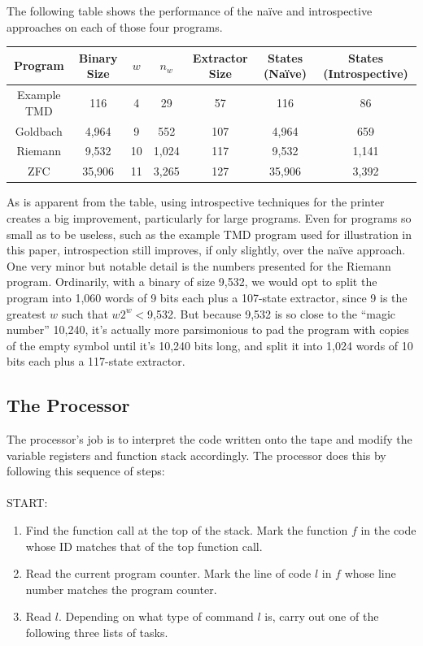 \documentclass[11pt]{article}
\begin{document}
The following table shows the performance of the na\"ive and introspective approaches on each of those four programs.

\begin{center}
    \begin{tabular}{||c c c c c c c||}
    \hline
    Program & Binary Size & $w$ & $n_w$ & Extractor Size & States (Na\"ive) & States (Introspective) \\ [0.5ex]
    \hline\hline
    Example TMD & 116 & 4 & 29 & 57 & 116 & 86 \\
    \hline
    Goldbach & 4,964 & 9 & 552 & 107 & 4,964 & 659 \\
    \hline
    Riemann & 9,532 & 10 & 1,024 & 117 & 9,532 & 1,141 \\
    \hline 
    ZFC & 35,906 & 11 & 3,265 & 127 & 35,906 & 3,392 \\
    \hline
    \end{tabular}
\end{center}
     
As is apparent from the table, using introspective techniques for the printer creates a big improvement, particularly for large programs. Even for programs so small as to be useless, such as the example TMD program used for illustration in this paper, introspection still improves, if only slightly, over the na\"ive approach. \\

One very minor but notable detail is the numbers presented for the Riemann program. Ordinarily, with a binary of size 9,532, we would opt to split the program into 1,060 words of 9 bits each plus a 107-state extractor, since 9 is the greatest $w$ such that $w2^w < $9,532. But because 9,532 is so close to the ``magic number'' 10,240, it's actually more parsimonious to pad the program with copies of the empty symbol until it's 10,240 bits long, and split it into 1,024 words of 10 bits each plus a 117-state extractor.

\subsection{The Processor}

The processor's job is to interpret the code written onto the tape and modify the variable registers and function stack accordingly. The processor does this by following this sequence of steps:  \\ \\
START:
\begin{enumerate}
\item Find the function call at the top of the stack. Mark the function $f$ in the code whose ID matches that of the top function call.
\item Read the current program counter. Mark the line of code $l$ in $f$ whose line number matches the program counter.
\item Read $l$. Depending on what type of command $l$ is, carry out one of the following three lists of tasks.
\end{enumerate}
\end{document}
